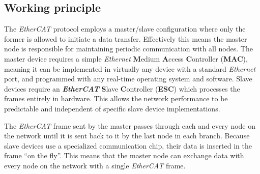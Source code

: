 \subsection{Working principle} \label{subsec:ecat_principle}

The \emph{EtherCAT} protocol employs a master/slave configuration where only the former is allowed to initiate a data transfer.
Effectively this means the master node is responsible for maintaining periodic communication with all nodes.
The master device requires a simple \emph{Ethernet} \textbf Medium \textbf Access \textbf Controller ({\bfseries MAC}), meaning it can be implemented in virtually any device with a standard \emph{Ethernet} port, and programmed with any real-time operating system and software.
Slave devices require an \textbf \emph{EtherCAT} \textbf Slave \textbf Controller ({\bfseries ESC}) which processes the frames entirely in hardware.
This allows the network performance to be predictable and independent of specific slave device implementations.

The \emph{EtherCAT} frame sent by the master passes through each and every node on the network until it is sent back to it by the last node in each branch.
Because slave devices use a specialized communication chip, their data is inserted in the frame ``on the fly''.
This means that the master node can exchange data with every node on the network with a single \emph{EtherCAT} frame.
